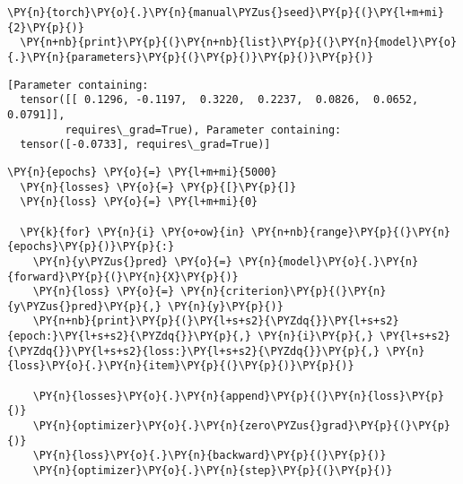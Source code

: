       \begin{tcolorbox}[breakable, size=fbox, boxrule=1pt, pad at break*=1mm,colback=cellbackground, colframe=cellborder]
  \begin{Verbatim}[commandchars=\\\{\}]
  \PY{n}{torch}\PY{o}{.}\PY{n}{manual\PYZus{}seed}\PY{p}{(}\PY{l+m+mi}{2}\PY{p}{)}
  \PY{n+nb}{print}\PY{p}{(}\PY{n+nb}{list}\PY{p}{(}\PY{n}{model}\PY{o}{.}\PY{n}{parameters}\PY{p}{(}\PY{p}{)}\PY{p}{)}\PY{p}{)}
  \end{Verbatim}
  \end{tcolorbox}

      \begin{Verbatim}[commandchars=\\\{\}]
  [Parameter containing:
  tensor([[ 0.1296, -0.1197,  0.3220,  0.2237,  0.0826,  0.0652,  0.0791]],
         requires\_grad=True), Parameter containing:
  tensor([-0.0733], requires\_grad=True)]
      \end{Verbatim}

      \begin{tcolorbox}[breakable, size=fbox, boxrule=1pt, pad at break*=1mm,colback=cellbackground, colframe=cellborder]
  \begin{Verbatim}[commandchars=\\\{\}]
  \PY{n}{epochs} \PY{o}{=} \PY{l+m+mi}{5000}
  \PY{n}{losses} \PY{o}{=} \PY{p}{[}\PY{p}{]}
  \PY{n}{loss} \PY{o}{=} \PY{l+m+mi}{0}

  \PY{k}{for} \PY{n}{i} \PY{o+ow}{in} \PY{n+nb}{range}\PY{p}{(}\PY{n}{epochs}\PY{p}{)}\PY{p}{:}
    \PY{n}{y\PYZus{}pred} \PY{o}{=} \PY{n}{model}\PY{o}{.}\PY{n}{forward}\PY{p}{(}\PY{n}{X}\PY{p}{)}
    \PY{n}{loss} \PY{o}{=} \PY{n}{criterion}\PY{p}{(}\PY{n}{y\PYZus{}pred}\PY{p}{,} \PY{n}{y}\PY{p}{)}
    \PY{n+nb}{print}\PY{p}{(}\PY{l+s+s2}{\PYZdq{}}\PY{l+s+s2}{epoch:}\PY{l+s+s2}{\PYZdq{}}\PY{p}{,} \PY{n}{i}\PY{p}{,} \PY{l+s+s2}{\PYZdq{}}\PY{l+s+s2}{loss:}\PY{l+s+s2}{\PYZdq{}}\PY{p}{,} \PY{n}{loss}\PY{o}{.}\PY{n}{item}\PY{p}{(}\PY{p}{)}\PY{p}{)}
    
    \PY{n}{losses}\PY{o}{.}\PY{n}{append}\PY{p}{(}\PY{n}{loss}\PY{p}{)}
    \PY{n}{optimizer}\PY{o}{.}\PY{n}{zero\PYZus{}grad}\PY{p}{(}\PY{p}{)}
    \PY{n}{loss}\PY{o}{.}\PY{n}{backward}\PY{p}{(}\PY{p}{)}
    \PY{n}{optimizer}\PY{o}{.}\PY{n}{step}\PY{p}{(}\PY{p}{)}
  \end{Verbatim}
  \end{tcolorbox}

